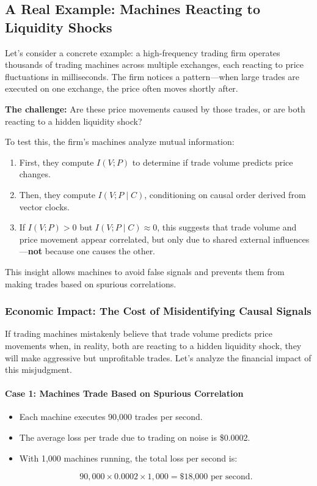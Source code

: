 \subsection{A Real Example: Machines Reacting to Liquidity Shocks}

Let’s consider a concrete example: a high-frequency trading firm operates thousands of trading machines across multiple exchanges, each reacting to price fluctuations in milliseconds. The firm notices a pattern—when large trades are executed on one exchange, the price often moves shortly after. 

\textbf{The challenge:} Are these price movements caused by those trades, or are both reacting to a hidden liquidity shock? 

To test this, the firm’s machines analyze mutual information:

\begin{enumerate}
    \item First, they compute \(I(V; P)\) to determine if trade volume predicts price changes.
    \item Then, they compute \(I(V; P \mid C)\), conditioning on causal order derived from vector clocks.
    \item If \( I(V; P) > 0 \) but \( I(V; P \mid C) \approx 0 \), this suggests that trade volume and price movement appear correlated, but only due to shared external influences—\textbf{not} because one causes the other.
\end{enumerate}

This insight allows machines to avoid false signals and prevents them from making trades based on spurious correlations.

\subsubsection*{Economic Impact: The Cost of Misidentifying Causal Signals}

If trading machines mistakenly believe that trade volume predicts price movements when, in reality, both are reacting to a hidden liquidity shock, they will make aggressive but unprofitable trades. Let’s analyze the financial impact of this misjudgment.

\paragraph{Case 1: Machines Trade Based on Spurious Correlation}

\begin{itemize}
    \item Each machine executes 90,000 trades per second.
    \item The average loss per trade due to trading on noise is \$0.0002.
    \item With 1,000 machines running, the total loss per second is:

    \[
    90,000 \times 0.0002 \times 1,000 = \text{\$18,000 per second}.
    \]

\end{itemize}

